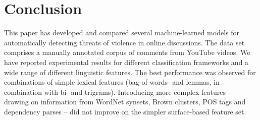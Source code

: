 \documentclass[11pt,letterpaper]{article}
\begin{document}
\section{Conclusion}
\label{sec:conclusion}

This paper has developed and compared several machine-learned models for automatically detecting threats of violence in online discussions. The data set comprises a manually annotated corpus of comments from YouTube videos. We have reported experimental results for different classification frameworks and a wide range of different linguistic features. The best performance was observed for combinations of simple lexical features (bag-of-words- and lemmas, in combination with bi- and trigrams). Introducing more complex features -- drawing on information from WordNet synsets, Brown clusters, POS tags and dependency parses -- did not improve on the simpler surface-based feature set.




\end{document}
